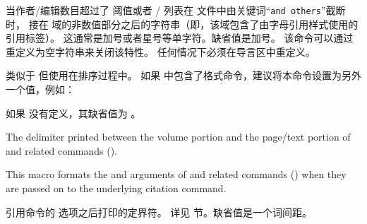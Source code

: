 \begin{ltxsyntax}
当作者/编辑数目超过了  阈值或者 \slash {} 列表在  文件中由关键词“\texttt{and others}”截断时，
接在  域的非数值部分之后的字符串（即，该域包含了由字母引用样式使用的引用标签）。
这通常是加号或者星号等单字符。缺省值是加号。
该命令可以通过重定义为空字符串来关闭该特性。
任何情况下必须在导言区中重定义。

类似于  但使用在排序过程中。
如果  中包含了格式命令，建议将本命令设置为另外一个值，例如：

\begin{ltxexample}
\renewcommand*{\labelalphaothers}{\textbf{+}}
\renewcommand*{\sortalphaothers}{+}
\end{ltxexample}
%
如果  没有定义，其缺省值为 。

The delimiter printed between the volume portion and the page/text portion of  and related commands ().


This macro formats the  and  arguments of  and related commands () when they are passed on to the underlying citation command.

引用命令的  选项之后打印的定界符。
详见  节。缺省值是一个词间距。


\end{ltxsyntax}
